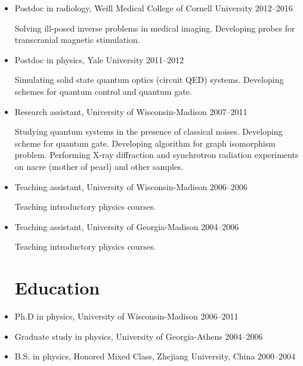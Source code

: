\documentclass[centered,11pt,overlapped]{res}
\begin{document}
\begin{resume}
{\begin{itemize}
\item Postdoc in radiology, Weill Medical College of Cornell University \hfill 2012--2016 

Solving ill-posed inverse problems in medical imaging.
Developing probes for transcranial magnetic stimulation.
\item Postdoc in physics, Yale University \hfill 2011--2012

Simulating solid state quantum optics (circuit QED) systems. 
Developing schemes for quantum control and quantum gate.
\item {Research assistant, University of Wisconsin-Madison} \hfill {2007--2011} 

Studying quantum systems in the presence of classical noises.
Developing scheme for quantum gate. 
Developing algorithm for graph isomorphism problem.
Performing X-ray diffraction and synchrotron radiation experiments on nacre (mother of pearl) and other samples.
\item {Teaching assistant, University of Wisconsin-Madison} \hfill {2006--2006} 

Teaching introductory physics courses.
\item {Teaching assistant, University of Georgia-Madison} \hfill {2004--2006} 

Teaching introductory physics courses.


\section{\sc Education}
\item {Ph.D in physics, University of Wisconsin-Madison} \hfill {2006--2011} 
\item {Graduate study in physics, University of Georgia-Athens} \hfill {2004--2006}  
\item {B.S. in physics, Honored Mixed Class},  
{Zhejiang University, China } \hfill {2000--2004}  
\end{itemize}



}
\end{resume}
\end{document}
